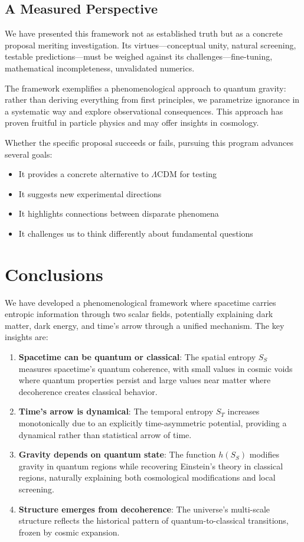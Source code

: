 \documentclass[12pt]{article}
\begin{document}
\subsection{A Measured Perspective}

We have presented this framework not as established truth but as a concrete proposal meriting investigation. Its virtues—conceptual unity, natural screening, testable predictions—must be weighed against its challenges—fine-tuning, mathematical incompleteness, unvalidated numerics.

The framework exemplifies a phenomenological approach to quantum gravity: rather than deriving everything from first principles, we parametrize ignorance in a systematic way and explore observational consequences. This approach has proven fruitful in particle physics and may offer insights in cosmology.

Whether the specific proposal succeeds or fails, pursuing this program advances several goals:
\begin{itemize}
    \item It provides a concrete alternative to $\Lambda$CDM for testing
    \item It suggests new experimental directions
    \item It highlights connections between disparate phenomena
    \item It challenges us to think differently about fundamental questions
\end{itemize}

\section{Conclusions}

We have developed a phenomenological framework where spacetime carries entropic information through two scalar fields, potentially explaining dark matter, dark energy, and time's arrow through a unified mechanism. The key insights are:
\begin{enumerate}
    \item \textbf{Spacetime can be quantum or classical}: The spatial entropy $S_S$ measures spacetime's quantum coherence, with small values in cosmic voids where quantum properties persist and large values near matter where decoherence creates classical behavior.
    \item \textbf{Time's arrow is dynamical}: The temporal entropy $S_T$ increases monotonically due to an explicitly time-asymmetric potential, providing a dynamical rather than statistical arrow of time.
    \item \textbf{Gravity depends on quantum state}: The function $h(S_S)$ modifies gravity in quantum regions while recovering Einstein's theory in classical regions, naturally explaining both cosmological modifications and local screening.
    \item \textbf{Structure emerges from decoherence}: The universe's multi-scale structure reflects the historical pattern of quantum-to-classical transitions, frozen by cosmic expansion.
\end{enumerate}
\end{document}
